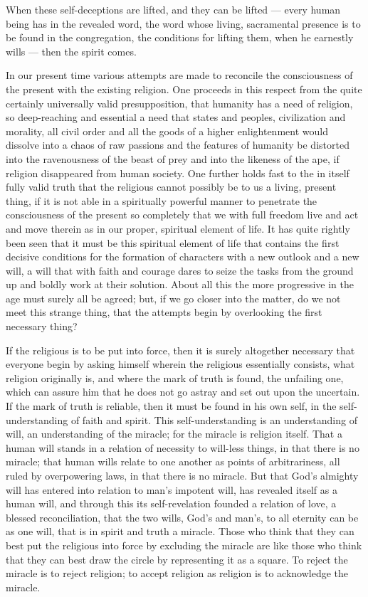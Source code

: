 \documentclass[12pt,a4paper,openany]{book}
\newcommand{\opage}[1]{\marginnote{\footnotesize\textit{[#1]}}}
\begin{document}
When these self-deceptions are lifted, and they can be lifted
--- every human being has in the revealed word, the word whose
living, sacramental presence is to be found in the congregation,
the conditions for lifting them, when he earnestly wills --- then
the spirit comes.

In our present time various attempts are made
to reconcile the consciousness of the present with the existing religion.
One proceeds in this respect from the quite
\setcounter{footnote}{0}%
\opage{62}certainly universally valid presupposition, that humanity has
a need of religion, so deep-reaching and essential a need
that states and peoples, civilization and morality, all civil
order and all the goods of a higher enlightenment would dissolve
into a chaos of raw passions and the features of humanity
be distorted into the ravenousness of the beast of prey and into the likeness of the ape,
if religion disappeared from human society.
One further holds fast to the in itself fully valid
truth that the religious cannot possibly be to us a living,
present thing, if it is not able in a spiritually powerful manner
to penetrate the consciousness of the present so completely
that we with full freedom live and act and move therein
as in our proper, spiritual element of life. It has quite
rightly been seen that it must be this spiritual element of life
that contains the first decisive conditions for the formation
of characters with a new outlook and a new will,
a will that with faith and courage dares to seize the tasks from
the ground up and boldly work at their solution. About all
this the more progressive in the age must surely all be
agreed; but, if we go closer into the matter, do we not
meet this strange thing, that the attempts begin by
overlooking the first necessary thing?

If the religious is to be put into force, then it is surely
altogether necessary that everyone begin by asking
himself wherein the religious essentially consists, what
religion originally is, and where the mark of truth is found,
the unfailing one, which can assure him that he does not
go astray and set out upon the uncertain. If the mark of truth
is reliable, then it must be found in his own
self, in the self-understanding of faith and spirit. This self-understanding
is an understanding of will, an understanding of the miracle;
for the miracle is religion itself. That a human will
stands in a relation of necessity to will-less things, in that
there is no miracle; that human wills relate to
one another as points of arbitrariness, all ruled by
overpowering laws, in that there is no miracle. But that God's
almighty will has entered into relation to man's
\setcounter{footnote}{0}%
\opage{63}impotent will, has revealed itself as a human will,
and through this its self-revelation founded a relation of love,
a blessed reconciliation, that the two wills, God's and man's,
to all eternity can be as one will, that is in
spirit and truth a miracle. Those who think that they can best
put the religious into force by excluding the miracle
are like those who think that they can best draw the circle
by representing it as a square. To reject the miracle
is to reject religion; to accept religion as religion
is to acknowledge the miracle.
\end{document}
